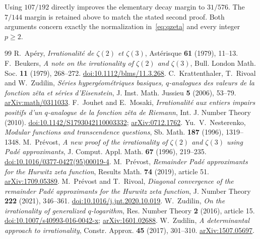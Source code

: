 \documentclass[11pt,letterpaper]{article}
\numberwithin{equation}{section}
\theoremstyle{remark}
\begin{document}
Using $107/192$ directly improves the elementary decay margin to $31/576$. The $7/144$ margin is retained above to match the stated second proof. Both arguments concern exactly the normalization in~\eqref{eq:qzeta} and every integer $p\ge2$.

\begin{thebibliography}{99}
 R.~Ap\'ery, \emph{Irrationalit\'e de $\zeta(2)$ et $\zeta(3)$}, Ast\'erisque \textbf{61} (1979), 11--13.
 F.~Beukers, \emph{A note on the irrationality of $\zeta(2)$ and $\zeta(3)$}, Bull. London Math. Soc. \textbf{11} (1979), 268--272. \href{https://doi.org/10.1112/blms/11.3.268}{doi:10.1112/blms/11.3.268}.
 C.~Krattenthaler, T.~Rivoal and W.~Zudilin, \emph{S\'eries hyperg\'eom\'etriques basiques, $q$-analogues des valeurs de la fonction z\^eta et s\'eries d'Eisenstein}, J. Inst. Math. Jussieu \textbf{5} (2006), 53--79. \href{https://arxiv.org/abs/math/0311033}{arXiv:math/0311033}.
 F.~Jouhet and E.~Mosaki, \emph{Irrationalit\'e aux entiers impairs positifs d'un $q$-analogue de la fonction z\^eta de Riemann}, Int. J. Number Theory (2010). \href{https://doi.org/10.1142/S1793042110003332}{doi:10.1142/S1793042110003332}; \href{https://arxiv.org/abs/0712.1762}{arXiv:0712.1762}.
 Yu.~V.~Nesterenko, \emph{Modular functions and transcendence questions}, Sb. Math. \textbf{187} (1996), 1319--1348.
 M.~Pr\'evost, \emph{A new proof of the irrationality of $\zeta(2)$ and $\zeta(3)$ using Pad\'e approximants}, J. Comput. Appl. Math. \textbf{67} (1996), 219--235. \href{https://doi.org/10.1016/0377-0427(95)00019-4}{doi:10.1016/0377-0427(95)00019-4}.
 M.~Pr\'evost, \emph{Remainder Pad\'e approximants for the Hurwitz zeta function}, Results Math. \textbf{74} (2019), article 51. \href{https://arxiv.org/abs/1709.05389}{arXiv:1709.05389}.
 M.~Pr\'evost and T.~Rivoal, \emph{Diagonal convergence of the remainder Pad\'e approximants for the Hurwitz zeta function}, J. Number Theory \textbf{222} (2021), 346--361. \href{https://doi.org/10.1016/j.jnt.2020.10.019}{doi:10.1016/j.jnt.2020.10.019}.
 W.~Zudilin, \emph{On the irrationality of generalized $q$-logarithm}, Res. Number Theory \textbf{2} (2016), article 15. \href{https://doi.org/10.1007/s40993-016-0042-x}{doi:10.1007/s40993-016-0042-x}; \href{https://arxiv.org/abs/1601.02688}{arXiv:1601.02688}.
 W.~Zudilin, \emph{A determinantal approach to irrationality}, Constr. Approx. \textbf{45} (2017), 301--310. \href{https://arxiv.org/abs/1507.05697}{arXiv:1507.05697}.

\end{thebibliography}
\end{document}
